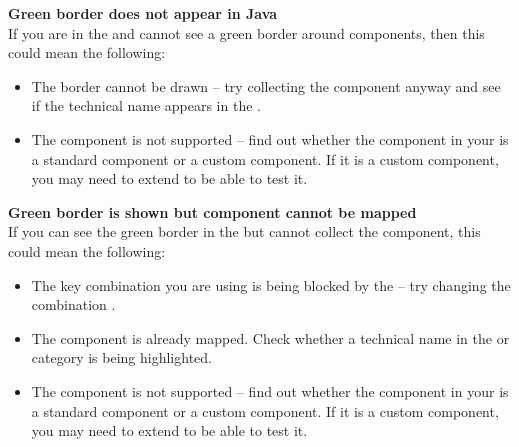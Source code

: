 % 
%
%


\textbf{Green border does not appear in Java \gdauts{}}\\
If you are in the \gdomm{}  and cannot see a green border around components, then this could mean the following:
\begin{itemize}
\item The border cannot be drawn -- try collecting the component anyway and see if the technical name appears in the \gdomeditor{}. 
\item The component is not supported -- find out whether the component in your \gdaut{} is a standard component or a custom component. If it is a custom component, you may need to extend \app{} to be able to test it. 
\end{itemize}

\textbf{Green border is shown but component cannot be mapped}\\
If you can see the green border in the \gdomm{} but cannot collect the component, this could mean the following:

\begin{itemize}
\item The key combination you are using is being blocked by the \gdaut{} -- try changing the combination .
\item The component is already mapped. Check whether a technical name in the  or  category is being highlighted.
\item The component is not supported -- find out whether the component in your \gdaut{} is a standard component or a custom component. If it is a custom component, you may need to extend \app{} to be able to test it.
\end{itemize}


